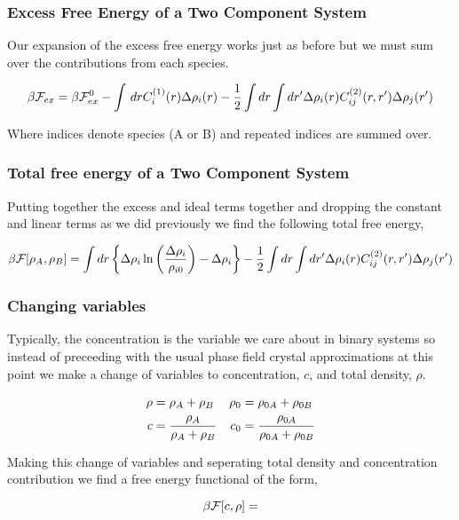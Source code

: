 \subsubsection{Excess Free Energy of a Two Component System} Our expansion of
the excess free energy works just as before but we must sum over the
contributions from each species.

\begin{equation} \beta\mathcal{F}_{ex} = \beta\mathcal{F}_{ex}^0 - \int \,dr C^{(1)}_{i}(r)
\Delta\rho_i(r) - \frac{1}{2} \int dr \int dr^\prime \Delta\rho_i(r)
C^{(2)}_{ij}(r, r^\prime) \Delta\rho_j(r^\prime) \end{equation}

Where indices denote species (A or B) and repeated indices are summed over.

\subsubsection{Total free energy of a Two Component System}

Putting together the excess and ideal terms together and dropping the constant
and linear terms as we did previously we find the following total free energy,

\begin{equation} \beta\mathcal{F}[\rho_A, \rho_B] = \int dr \left\lbrace \Delta\rho_i
\ln\left(\frac{\Delta\rho_i}{\rho_{i0}}\right) - \Delta\rho_i\right\rbrace - \frac{1}{2} \int dr
\int dr^\prime \Delta\rho_i(r) C^{(2)}_{ij}(r, r^\prime) \Delta
\rho_j(r^\prime) \end{equation}

\subsubsection{Changing variables} Typically, the concentration is the variable
we care about in binary systems so instead of preceeding with the usual phase
field crystal approximations at this point we make a change of variables to
concentration, $c$, and total density, $\rho$.

\begin{align} \rho &= \rho_A + \rho_B             & \rho_0 &= \rho_{0A} +
\rho_{0B} \nonumber \\ c &= \frac{\rho_A}{\rho_A + \rho_B}    &  c_0 &=
\frac{\rho_{0A}}{\rho_{0A} + \rho_{0B}} \nonumber \end{align}

Making this change of variables and seperating total density and concentration
contribution we find a free energy functional of the form,

\begin{equation} \beta\mathcal{F}[c, \rho] = \end{equation}
